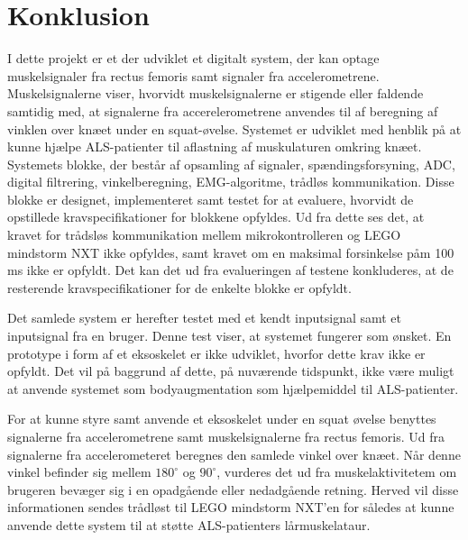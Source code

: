 \section{Konklusion}

I dette projekt er et der udviklet et digitalt system, der kan optage muskelsignaler fra rectus femoris samt signaler fra accelerometrene. Muskelsignalerne viser, hvorvidt muskelsignalerne er stigende eller faldende samtidig med, at signalerne fra accerelerometrene anvendes til af beregning af vinklen over knæet under en squat-øvelse. Systemet er udviklet med henblik på at kunne hjælpe ALS-patienter til aflastning af muskulaturen omkring knæet. Systemets blokke, der består af opsamling af signaler, spændingsforsyning, ADC, digital filtrering, vinkelberegning, EMG-algoritme, trådløs kommunikation. Disse blokke er designet, implementeret samt testet for at evaluere, hvorvidt de opstillede kravspecifikationer for blokkene opfyldes.
Ud fra dette ses det, at kravet for trådsløs kommunikation mellem mikrokontrolleren og LEGO mindstorm NXT ikke opfyldes, samt kravet om en maksimal forsinkelse påm 100 ms ikke er opfyldt. Det kan det ud fra evalueringen af testene konkluderes, at de resterende kravspecifikationer for de enkelte blokke er opfyldt. 

Det samlede system er herefter testet med et kendt inputsignal samt et inputsignal fra en bruger. Denne test viser, at systemet fungerer som ønsket. En prototype i form af et eksoskelet er ikke udviklet, hvorfor dette krav ikke er opfyldt. Det vil på baggrund af dette, på nuværende tidspunkt, ikke være muligt at anvende systemet som bodyaugmentation som hjælpemiddel til ALS-patienter. 

For at kunne styre samt anvende et eksoskelet under en squat øvelse benyttes signalerne fra accelerometrene samt muskelsignalerne fra rectus femoris. Ud fra signalerne fra accelerometeret beregnes den samlede vinkel over knæet. Når denne vinkel befinder sig mellem $180^{\circ}$ og $90^{\circ}$, vurderes det ud fra muskelaktivitetem om brugeren bevæger sig i en opadgående eller nedadgående retning. Herved vil disse informationen sendes trådløst til LEGO mindstorm NXT'en for således at kunne anvende dette system til at støtte ALS-patienters lårmuskelataur. 